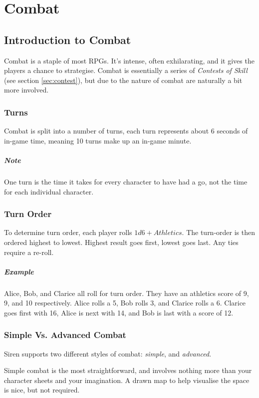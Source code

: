 \chapter{Combat}
\section{Introduction to Combat}
Combat is a staple of most RPGs. 
It's intense, often exhilarating, and it gives the players a chance to strategise.
Combat is essentially a series of \textit{Contests of Skill} (see section \ref{sec:contest}), but due to the nature of combat are naturally a bit more involved.
\subsection{Turns}
Combat is split into a number of turns, each turn represents about 6 seconds of in-game time, meaning 10 turns make up an in-game minute.

\paragraph{Note} One turn is the time it takes for every character to have had a go, not the time for each individual character.
\subsection{Turn Order}
To determine turn order, each player rolls $1d6+Athletics$. The turn-order is then ordered highest to lowest. Highest result goes first, lowest goes last. Any ties require a re-roll.

\paragraph{Example} Alice, Bob, and Clarice all roll for turn order. They have an athletics score of 9, 9, and 10 respectively. Alice rolls a 5, Bob rolls 3, and Clarice rolls a 6. Clarice goes first with 16, Alice is next with 14, and Bob is last with a score of 12.

\subsection{Simple Vs. Advanced Combat}
Siren supports two different styles of combat: \textit{simple}, and \textit{advanced}.

Simple combat is the most straightforward, and involves nothing more than your character sheets and your imagination. A drawn map to help visualise the space is nice, but not required.

